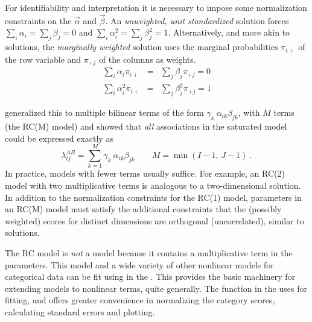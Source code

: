 \documentclass[11pt]{book}\usepackage[]{graphicx}\usepackage[]{color}
\begin{document}
For identifiability and interpretation
it is necessary to impose some normalization constraints on the
$\vec{\alpha}$ and $\vec{\beta}$.
An \emph{unweighted, unit standardized} solution forces
$\sum_i \alpha_i = \sum_j \beta_j =0$ and
$\sum_i \alpha_i^2 = \sum_j \beta_j^2 =1$.
Alternatively, and more akin to \ca solutions, the \emph{marginally weighted} solution
uses the marginal probabilities $\pi_{i+}$ of the row variable and $\pi_{+j}$
of the columns as weights.
\begin{eqnarray}
\sum_i \alpha_i \pi_{i+} & = & \sum_j \beta_j \pi_{+j} = 0 \label{eq:RC-constraints} \\
\sum_i \alpha_i^2 \pi_{i+} & = & \sum_j \beta_j^2 \pi_{+j} = 1 \nonumber
\end{eqnarray}


\citet{Goodman:86} generalized this to multiple bilinear terms
of the form $\gamma_k \: \alpha_{ik} \beta_{jk}$, with $M$ terms (the RC(M) model)
and showed that
\emph{all} associations in the saturated model could be expressed exactly as
\begin{equation}\label{eq:RCm}
\lambda_{ij}^{AB} =
 \sum_{k=1}^M  \gamma_k \: \alpha_{ik} \beta_{jk} \quad\quad M=\min{(I-1,\,  J-1)}
 \period
\end{equation}
In practice, models with fewer terms usually suffice.
For example, an RC(2) model with two multiplicative terms is analogous to
a two-dimensional \ca solution.
In addition to the normalization constraints for the RC(1) model,
parameters in an RC(M) model must satisfy the additional constraints
that the  (possibly weighted) scores for distinct dimensions are
orthogonal (uncorrelated), similar to \ca solutions.



The RC model is \emph{not} a \loglin model
because it contains a multiplicative term in the parameters.
This model and a wide variety of
other nonlinear models for categorical data
can be fit using  in the .
This provides the basic machinery for extending  models
to nonlinear terms, quite generally.
The function  in the
 uses  for fitting, and
offers greater convenience in normalizing the
category scores, calculating standard errors and plotting.
\end{document}
